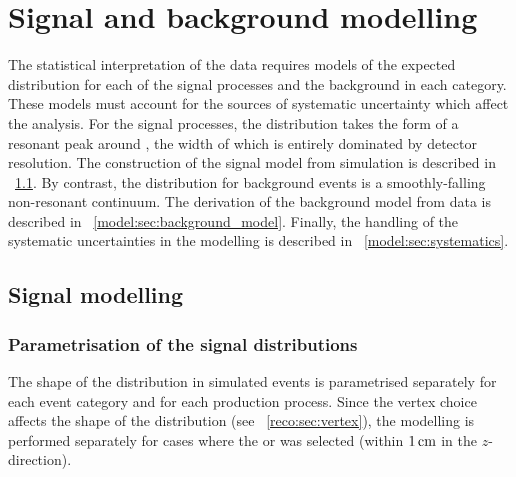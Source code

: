 \chapter{Signal and background modelling}
\label{chap:model}

The statistical interpretation of the data requires models of the expected \mgg distribution for each of the signal processes and the background in each category. These models must account for the sources of systematic uncertainty which affect the analysis. %
For the signal processes, the \mgg distribution takes the form of a resonant peak around \mH, the width of which is entirely dominated by detector resolution. The construction of the signal model from simulation is described in \Sec~\ref{model:sec:signal_model}. By contrast, the \mgg distribution for background events is a smoothly-falling non-resonant continuum. The derivation of the background model from data is described in \Sec~\ref{model:sec:background_model}. Finally, the handling of the systematic uncertainties in the modelling is described in \Sec~\ref{model:sec:systematics}. 

\section{Signal modelling}
\label{model:sec:signal_model}

\subsection{Parametrisation of the signal \mgg distributions}

The shape of the \mgg distribution in simulated \Hgg events is parametrised separately for each event category and for each production process. %
Since the vertex choice affects the shape of the \mgg distribution (see \Sec~\ref{reco:sec:vertex}), the modelling is performed separately for cases where the \RV or \WV was selected (within $1\,\text{cm}$ in the $z$-direction).

